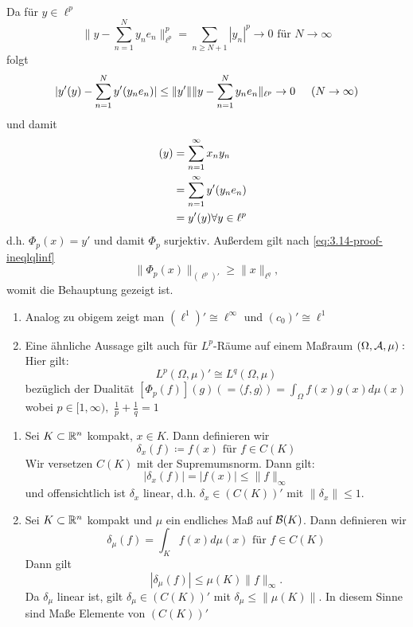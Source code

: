 \begin{beispiel}
\begin{beweis}
\begin{align}
		\end{align} 
		Da für $y \in \ell^{p}$
		\[ \| y - \sum_{n = 1}^{N} y_{n} e_{n} \|_{\ell^{p}}^{p} = \sum_{n \geq N + 1} |y_{n}|^{p} \rightarrow 0 \text{ für } N \rightarrow \infty \]
		folgt
		\[ | y' (y) - \sum_{n = 1}^{N} y' ( y_{n} e_{n} ) | \leq \| y' \| \| y - \sum_{n = 1}^{N} y_{n} e_{n} \|_{\ell^{p}}  \rightarrow 0 \hspace{0.5cm} (N \rightarrow \infty) \]
		und damit \\
		\begin{align*}
			[ \Phi_{p} (x) ](y) & = \sum_{n = 1}^{\infty} x_{n} y_{n} \\
			& = \sum_{n = 1}^{\infty} y'(y_{n} e_{n}) \hspace{0.25cm} \\
			& = y'(y) \forall y \in \ell^{p} 		
		\end{align*}
		d.h. $ \Phi_{p}(x) = y'$ und damit $\Phi_{p}$ surjektiv.
		Au{\ss}erdem gilt nach \eqref{eq:3.14-proof-ineqlqlinf}
		\[ \| \Phi_{p}(x) \|_{(\ell^{p})'} \geq \| x \|_{\ell^{q}}, \]
		womit die Behauptung gezeigt ist.
	\end{beweis}
\end{beispiel}


\begin{bemerkung*}
	\begin{enumerate}[label=\alph*\upshape)]
		\item Analog zu obigem zeigt man $(\ell^{1})' \cong \ell^{\infty}$ und $(c_{0})' \cong \ell^{1}$
		\item Eine ähnliche Aussage gilt auch für $L^{p}$-Räume auf einem Ma{\ss}raum $(\Omega, \mathcal{A}, \mu):$
			Hier gilt:
			\[ L^{p}(\Omega, \mu)' \cong L^{q}(\Omega, \mu) \]
			bezüglich der Dualität $[\Phi_{p}(f)](g) (= \langle f, g \rangle ) = \int_{\Omega} f(x) g(x) d\mu(x)$ wobei $p \in [1, \infty),$ $\frac{1}{p} + \frac{1}{q} = 1$
	\end{enumerate}	
\end{bemerkung*}


\begin{beispiel} \label{bsp:3.15}
	\begin{enumerate}[label=\alph*\upshape)]
		\item Sei $K \subset \mathbb{R}^{n}$ kompakt, $x \in K$. Dann definieren wir
			\[ \delta_{x}(f) \coloneqq f(x) \text{ für } f \in C(K) \]
			Wir versetzen $C(K)$ mit der Supremumsnorm. Dann gilt:
			\[ |\delta_{x}(f)| = | f(x) | \leq \| f \|_{\infty} \]
			und offensichtlich ist $\delta_{x}$ linear, d.h. $\delta_{x} \in ( C(K) )'$ mit $\| \delta_{x} \| \leq 1$.
		\item Sei $K \subset \mathbb{R}^{n}$ kompakt und $\mu$ ein endliches Ma{\ss} auf $\mathcal{B}(K)$. Dann definieren wir 
			\[ \delta_{\mu}(f) = \int_{K} f(x) d\mu(x) \text{ für } f \in C(K) \]
			Dann gilt
			\[ | \delta_{\mu} (f) | \leq \mu(K) \| f \| _{\infty}. \]
			Da $\delta_{\mu}$ linear ist, gilt $\delta_{\mu}\in (C(K))'$ mit $\delta_{\mu} \leq \| \mu (K) \|$. In diesem Sinne sind Ma{\ss}e Elemente von $(C(K))'$
	\end{enumerate}	
\end{beispiel}


